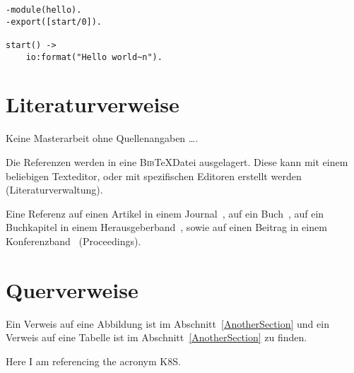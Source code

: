 
\lstset{language=erlang, style=customerlang}

\begin{lstlisting}[caption=Das übliche 'Hello World' Spektakel -- diesmal in Erlang.]
-module(hello).
-export([start/0]).

start() ->
	io:format("Hello world~n").
\end{lstlisting}

\section{Literaturverweise}

Keine Masterarbeit ohne Quellenangaben \ldots. 

Die Referenzen werden in eine \textsc{Bib}\TeX Datei ausgelagert. Diese kann mit einem beliebigen Texteditor, oder mit spezifischen Editoren erstellt werden (Literaturverwaltung).

Eine Referenz auf einen Artikel in einem Journal~\cite{Brand:1983vx}, auf ein Buch~\cite{Weske:2012ul}, auf ein Buchkapitel in einem Herausgeberband~\cite{singer2015}, sowie auf einen Beitrag in einem Konferenzband~\cite{Singer:2016hl} (Proceedings).

\section{Querverweise}

Ein Verweis auf eine Abbildung ist im Abschnitt~\ref{AnotherSection} und ein Verweis auf eine Tabelle ist im Abschnitt~\ref{AnotherSection} zu finden.

Here I am referencing the acronym \ac{K8S}.
